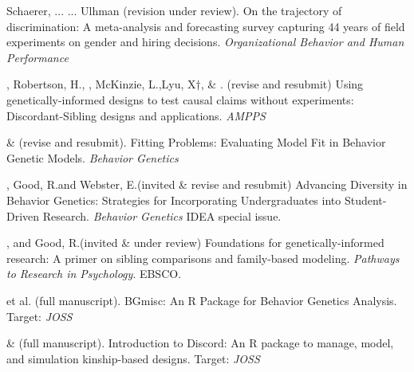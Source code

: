 


\item Schaerer, ... \meb ... Ulhman (revision under review). On the trajectory of discrimination: A meta-analysis and forecasting survey capturing 44 years of field experiments on gender and hiring decisions. \textit{Organizational Behavior and Human Performance}

\item \meb, Robertson, H.\noteA, \jt, McKinzie, L.,\noteA Lyu, X$\dagger$, \& \joe. (revise and resubmit) Using genetically-informed designs to test causal claims without experiments: Discordant-Sibling designs and applications. \href{https://osf.io/zpdwt/}{\small\color{blue}{osf.io/zpdwt/}} \textit{AMPPS} %

\item \meb \& \joe (revise and resubmit). Fitting Problems: Evaluating Model Fit in Behavior Genetic Models. \textit{Behavior Genetics}  \href{https://doi.org/10.31234/osf.io/qys83}{\small\color{blue}{10.31234/osf.io/qys83}}


\item \meb, Good, R.\noteA and Webster, E.\noteA  (invited \& revise and resubmit) Advancing Diversity in Behavior Genetics: Strategies for Incorporating Undergraduates into Student-Driven Research. \textit{Behavior Genetics} IDEA special issue. \href{10.31234/osf.io/9x7wf}{\small\color{blue}{10.31234/osf.io/9x7wf}} 



\item \meb, and Good, R.\noteA (invited \& under review) Foundations for genetically-informed research: A primer on sibling comparisons and family-based modeling. \textit{Pathways to Research in Psychology}. EBSCO.


\item \meb et al. (full manuscript). BGmisc: An R Package for Behavior Genetics Analysis. Target: \textit{JOSS}
\item \jt \& \meb (full manuscript). Introduction to Discord: An R package to manage, model, and simulation kinship-based designs. Target: \textit{JOSS}


